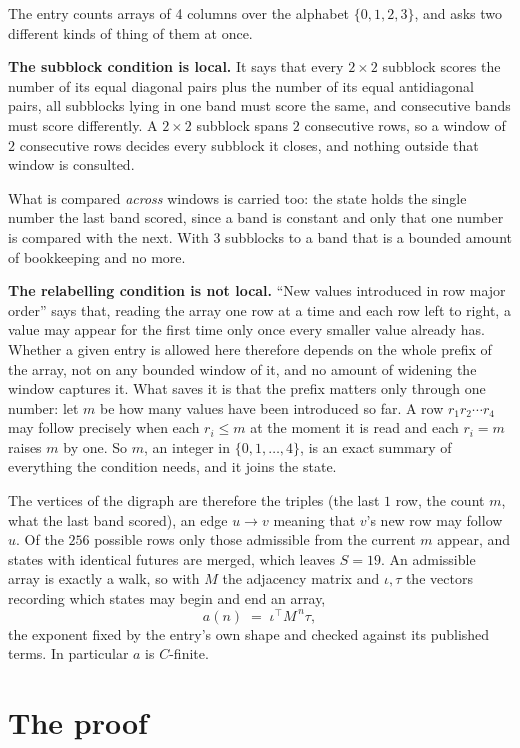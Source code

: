 \documentclass[11pt,a4paper]{article}
\theoremstyle{plain}
\theoremstyle{definition}
\begin{document}
The entry counts arrays of 4 columns over the alphabet $\{0,1,2,3\}$, and asks two different kinds of thing of them at once.

\textbf{The subblock condition is local.} It says that every $2\times2$ subblock scores the number of its equal diagonal pairs plus the number of its equal antidiagonal pairs, all subblocks lying in one band must score the same, and consecutive bands must score differently. A $ 2\times2$ subblock spans $2$ consecutive rows, so a window of $2$ consecutive rows decides every subblock it closes, and nothing outside that window is consulted.

What is compared \emph{across} windows is carried too: the state holds the single number the last band scored, since a band is constant and only that one number is compared with the next. With $3$ subblocks to a band that is a bounded amount of bookkeeping and no more.

\textbf{The relabelling condition is not local.} ``New values introduced in row major order'' says that, reading the array one row at a time and each row left to right, a value may appear for the first time only once every smaller value already has. Whether a given entry is allowed here therefore depends on the whole prefix of the array, not on any bounded window of it, and no amount of widening the window captures it. What saves it is that the prefix matters only through one number: let $m$ be how many values have been introduced so far. A row $r_1r_2\cdots r_4$ may follow precisely when each $r_i\le m$ at the moment it is read and each $r_i=m$ raises $m$ by one. So $m$, an integer in $\{0,1,\dots,4\}$, is an exact summary of everything the condition needs, and it joins the state.

The vertices of the digraph are therefore the triples (the last $1$ row, the count $m$, what the last band scored), an edge $u\to v$ meaning that $v$'s new row may follow $u$. Of the $256$ possible rows only those admissible from the current $m$ appear, and states with identical futures are merged, which leaves $S=19$. An admissible array is exactly a walk, so with $M$ the adjacency matrix and $\iota,\tau$ the vectors recording which states may begin and end an array,
\[
a(n)\;=\;\iota^{\!\top}M^{\,n}\tau ,
\]
the exponent fixed by the entry's own shape and checked against its published terms. In
particular $a$ is $C$-finite.

\section{The proof}
\end{document}
